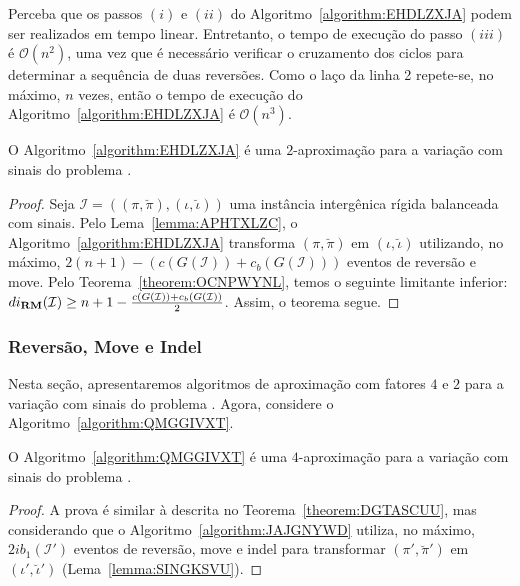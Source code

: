 Perceba que os passos $(i)$ e $(ii)$ do Algoritmo~\ref{algorithm:EHDLZXJA} podem ser realizados em tempo linear. Entretanto, o tempo de execução do passo $(iii)$ é $\mathcal{O}(n^2)$, uma vez que é necessário verificar o cruzamento dos ciclos para determinar a sequência de duas reversões. Como o laço da linha 2 repete-se, no máximo, $n$ vezes, então o tempo de execução do Algoritmo~\ref{algorithm:EHDLZXJA} é $\mathcal{O}(n^3)$.

\begin{theorem}\label{theorem:JYTYUTQA}
O Algoritmo~\ref{algorithm:EHDLZXJA} é uma $2$-aproximação para a variação com sinais do problema \SbIRM{}.
\end{theorem}
\begin{proof}
Seja $\mathcal{I} = ((\pi,\breve\pi),(\iota,\breve\iota))$ uma instância intergênica rígida balanceada com sinais. Pelo Lema~\ref{lemma:APHTXLZC}, o Algoritmo~\ref{algorithm:EHDLZXJA} transforma $(\pi,\breve\pi)$ em $(\iota,\breve\iota)$ utilizando, no máximo, $2(n + 1) - (c(G(\mathcal{I})) + c_b(G(\mathcal{I})))$ eventos de reversão e move. Pelo Teorema~\ref{theorem:OCNPWYNL}, temos o seguinte limitante inferior: $di_{\textbf{RM}}(\mathcal{I}) \ge {n + 1} - \frac{c(G(\mathcal{I})) + c_b(G(\mathcal{I}))}{2}$. Assim, o teorema segue.
\end{proof}

\subsubsection{Reversão, Move e Indel}

Nesta seção, apresentaremos algoritmos de aproximação com fatores $4$ e $2$ para a variação com sinais do problema \SbIRMI{}. Agora, considere o Algoritmo~\ref{algorithm:QMGGIVXT}.



\begin{theorem}\label{theorem:PZXMHZFE}
O Algoritmo~\ref{algorithm:QMGGIVXT} é uma $4$-aproximação para a variação com sinais do problema \SbIRMI{}.
\end{theorem}
\begin{proof}
A prova é similar à descrita no Teorema~\ref{theorem:DGTASCUU}, mas considerando que o Algoritmo~\ref{algorithm:JAJGNYWD} utiliza, no máximo, $2ib_1(\mathcal{I'})$ eventos de reversão, move e indel para transformar $(\pi',\breve\pi')$ em $(\iota',\breve\iota')$ (Lema~\ref{lemma:SINGKSVU}).
\end{proof}

